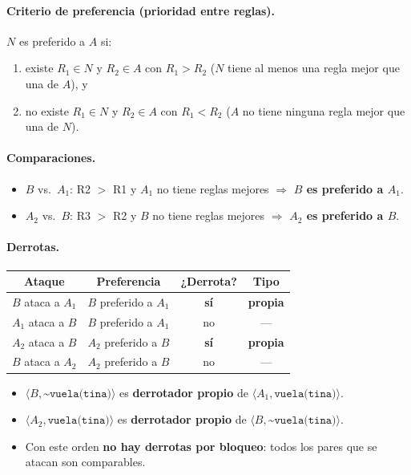\documentclass[11pt,a4paper]{article}
\newcommand{\nf}{\textasciitilde}                 %
\begin{document}
\paragraph{Criterio de preferencia (prioridad entre reglas).} $N$ es preferido a $A$ si:
\begin{enumerate}
  \item existe $R_1 \in N$ y $R_2 \in A$ con $R_1 > R_2$ ($N$ tiene al menos una regla mejor que una de $A$), y
  \item no existe $R_1 \in N$ y $R_2 \in A$ con $R_1 < R_2$ ($A$ no tiene ninguna regla mejor que una de $N$).
\end{enumerate}

\paragraph{Comparaciones.}
\begin{itemize}
  \item $B$ vs.\ $A_1$: R2 $>$ R1 y $A_1$ no tiene reglas mejores $\Rightarrow$ \textbf{$B$ es preferido a $A_1$}.
  \item $A_2$ vs.\ $B$: R3 $>$ R2 y $B$ no tiene reglas mejores $\Rightarrow$ \textbf{$A_2$ es preferido a $B$}.
\end{itemize}

\paragraph{Derrotas.}
\begin{center}
\small
\begin{tabular}{@{}c c c c@{}}
\toprule
\textbf{Ataque} & \textbf{Preferencia} & \textbf{¿Derrota?} & \textbf{Tipo} \\
\midrule
$B$ ataca a $A_1$ & $B$ preferido a $A_1$ & \textbf{sí} & \textbf{propia} \\
$A_1$ ataca a $B$ & $B$ preferido a $A_1$ & no & --- \\
$A_2$ ataca a $B$ & $A_2$ preferido a $B$ & \textbf{sí} & \textbf{propia} \\
$B$ ataca a $A_2$ & $A_2$ preferido a $B$ & no & --- \\
\bottomrule
\end{tabular}
\end{center}
\begin{itemize}
  \item $\langle B, \texttt{\nf vuela(tina)}\rangle$ es \textbf{derrotador propio} de $\langle A_1, \texttt{vuela(tina)}\rangle$.
  \item $\langle A_2, \texttt{vuela(tina)}\rangle$ es \textbf{derrotador propio} de $\langle B, \texttt{\nf vuela(tina)}\rangle$.
  \item Con este orden \textbf{no hay derrotas por bloqueo}: todos los pares que se atacan son comparables.
\end{itemize}
\end{document}
